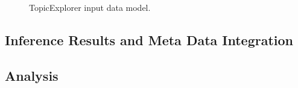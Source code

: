 \begin{figure}
\centering
\scalebox{\tikzScale}{\adjustTikzSize }
\caption[TopicExplorer input data model]{TopicExplorer input data model.}\label{fig:TopicExplorer_data_erm}
\end{figure}

\subsection{Inference Results and Meta Data Integration}

\subsection{Analysis}
